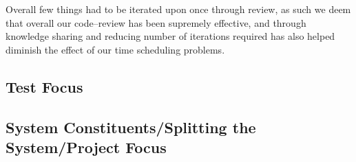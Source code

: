 Overall few things had to be iterated upon once through review, as such we deem that overall our code--review has been supremely effective, and through knowledge sharing and reducing number of iterations required has also helped diminish the effect of our time scheduling problems.
\subsection{Test Focus}
\subsection{System Constituents/Splitting the System/Project Focus}
